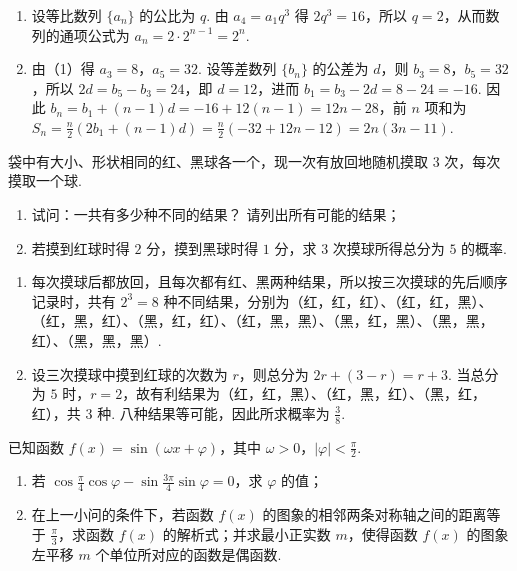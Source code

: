 \begin{solution}
\begin{enumerate}
\item 设等比数列 \(\{a_n\}\) 的公比为 \(q\). 由 \(a_4=a_1q^3\) 得 \(2q^3=16\)，所以 \(q=2\)，从而数列的通项公式为 \(a_n=2\cdot2^{n-1}=2^n\).
\item 由（1）得 \(a_3=8\)，\(a_5=32\). 设等差数列 \(\{b_n\}\) 的公差为 \(d\)，则 \(b_3=8\)，\(b_5=32\)，所以 \(2d=b_5-b_3=24\)，即 \(d=12\)，进而 \(b_1=b_3-2d=8-24=-16\). 因此 \(b_n=b_1+(n-1)d=-16+12(n-1)=12n-28\)，前 \(n\) 项和为 \(S_n=\frac{n}{2}\left(2b_1+(n-1)d\right)=\frac{n}{2}\left(-32+12n-12\right)=2n(3n-11)\).
\end{enumerate}
\end{solution}

\begin{problem}
袋中有大小、形状相同的红、黑球各一个，现一次有放回地随机摸取 \(3\) 次，每次摸取一个球.

\begin{enumerate}
\item 试问：一共有多少种不同的结果？ 请列出所有可能的结果；
\item 若摸到红球时得 \(2\) 分，摸到黑球时得 \(1\) 分，求 \(3\) 次摸球所得总分为 \(5\) 的概率.
\end{enumerate}

\end{problem}

\begin{solution}
\begin{enumerate}
\item 每次摸球后都放回，且每次都有红、黑两种结果，所以按三次摸球的先后顺序记录时，共有 \(2^3=8\) 种不同结果，分别为（红，红，红）、（红，红，黑）、（红，黑，红）、（黑，红，红）、（红，黑，黑）、（黑，红，黑）、（黑，黑，红）、（黑，黑，黑）.
\item 设三次摸球中摸到红球的次数为 \(r\)，则总分为 \(2r+(3-r)=r+3\). 当总分为 \(5\) 时，\(r=2\)，故有利结果为（红，红，黑）、（红，黑，红）、（黑，红，红），共 \(3\) 种. 八种结果等可能，因此所求概率为 \(\frac{3}{8}\).
\end{enumerate}
\end{solution}

\begin{problem}
已知函数 \(f(x) = \sin (\omega x + \varphi)\)，其中 \(\omega > 0\)，\(|\varphi| < \frac{\pi}{2}\).

\begin{enumerate}
\item 若 \(\cos\frac{\pi}{4}\cos\varphi-\sin\frac{3\pi}{4}\sin\varphi=0\)，求 \(\varphi\) 的值；
\item 在上一小问的条件下，若函数 \(f(x)\) 的图象的相邻两条对称轴之间的距离等于 \(\frac{\pi}{3}\)，求函数 \(f(x)\) 的解析式；并求最小正实数 \(m\)，使得函数 \(f(x)\) 的图象左平移 \(m\) 个单位所对应的函数是偶函数.
\end{enumerate}

\end{problem}

